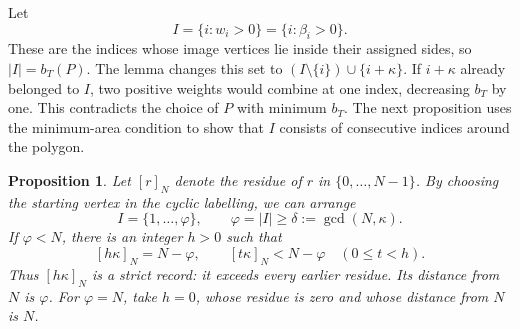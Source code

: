 \documentclass[11pt,a4paper]{article}
\newtheorem{proposition}[theorem]{Proposition}
\theoremstyle{definition}
\theoremstyle{remark}
\numberwithin{equation}{section}
\begin{document}
Let
\[
 I=\{i:w_i>0\}=\{i:\beta_i>0\}.
\]
These are the indices whose image vertices lie inside their assigned sides, so $|I|=b_T(P)$. The lemma changes this set to $(I\setminus\{i\})\cup\{i+\kappa\}$. If $i+\kappa$ already belonged to $I$, two positive weights would combine at one index, decreasing $b_T$ by one. This contradicts the choice of $P$ with minimum $b_T$. The next proposition uses the minimum-area condition to show that $I$ consists of consecutive indices around the polygon.

\begin{proposition}\label{prop:interval}
Let $[r]_N$ denote the residue of $r$ in $\{0,\ldots,N-1\}$. By choosing the starting vertex in the cyclic labelling, we can arrange
\[
 I=\{1,\ldots,\varphi\},\qquad \varphi=|I|\ge\delta:=\gcd(N,\kappa).
\]
If $\varphi<N$, there is an integer $h>0$ such that
\begin{equation}\label{eq:record}
 [h\kappa]_N=N-\varphi,
 \qquad [t\kappa]_N<N-\varphi\quad(0\le t<h).
\end{equation}
Thus $[h\kappa]_N$ is a strict record: it exceeds every earlier residue. Its distance from $N$ is $\varphi$. For $\varphi=N$, take $h=0$, whose residue is zero and whose distance from $N$ is $N$.
\end{proposition}
\end{document}
